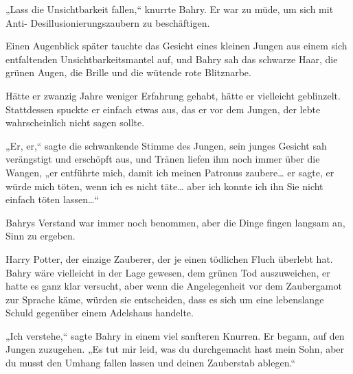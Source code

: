 „Lass die Unsichtbarkeit fallen,“ knurrte Bahry. Er war zu müde, um sich mit Anti- Desillusionierungszaubern zu beschäftigen.

Einen Augenblick später tauchte das Gesicht eines kleinen Jungen aus einem sich entfaltenden Unsichtbarkeitsmantel auf, und Bahry sah das schwarze Haar, die grünen Augen, die Brille und die wütende rote Blitznarbe.

Hätte er zwanzig Jahre weniger Erfahrung gehabt, hätte er vielleicht geblinzelt. Stattdessen spuckte er einfach etwas aus, das er vor dem Jungen, der lebte wahrscheinlich nicht sagen sollte.

„Er, er,“ sagte die schwankende Stimme des Jungen, sein junges Gesicht sah verängstigt und erschöpft aus, und Tränen liefen ihm noch immer über die Wangen, „er entführte mich, damit ich meinen Patronus zaubere… er sagte, er würde mich töten, wenn ich es nicht täte… aber ich konnte ich ihn Sie nicht einfach töten lassen…“

Bahrys Verstand war immer noch benommen, aber die Dinge fingen langsam an, Sinn zu ergeben.

Harry Potter, der einzige Zauberer, der je einen tödlichen Fluch überlebt hat. Bahry wäre vielleicht in der Lage gewesen, dem grünen Tod auszuweichen, er hatte es ganz klar versucht, aber wenn die Angelegenheit vor dem Zaubergamot zur Sprache käme, würden sie entscheiden, dass es sich um eine lebenslange Schuld gegenüber einem Adelshaus handelte.

„Ich verstehe,“ sagte Bahry in einem viel sanfteren Knurren. Er begann, auf den Jungen zuzugehen. „Es tut mir leid, was du durchgemacht hast mein Sohn, aber du musst den Umhang fallen lassen und deinen Zauberstab ablegen.“

